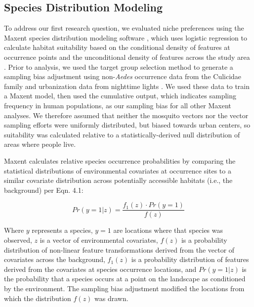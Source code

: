 \subsection{Species Distribution Modeling}

To address our first research question, we evaluated niche preferences using the Maxent species distribution modeling software \cite{Phillips2006-ua, Steven_J_Phillips_Miroslav_Dudik_Robert_E_Schapire_undated-nv}, which uses logistic regression to calculate habitat suitability based on the conditional density of features at occurrence points and the unconditional density of features across the study area \cite{Elith2011-kb}. Prior to analysis, we used the target group selection method \cite{Phillips2009-nf, Merow2013-mw} to generate a sampling bias adjustment using non-\textit{Aedes} occurrence data from the Culicidae family and urbanization data from nighttime lights \cite{Mills2013-yb}. We used these data to train a Maxent model, then used the cumulative output, which indicates sampling frequency in human populations, as our sampling bias for all other Maxent analyses. We therefore assumed that neither the mosquito vectors nor the vector sampling efforts were uniformly distributed, but biased towards urban centers, so suitability was calculated relative to a statistically-derived null distribution of areas where people live.

Maxent calculates relative species occurrence probabilities by comparing the statistical distributions of environmental covariates at occurrence sites to a similar covariate distribution across potentially accessible habitats (i.e., the background) per Eqn. 4.1:

\begin{equation}
Pr(y=1|z) = 
\frac{f_1(z) \cdot Pr(y=1)}{f(z)}
\end{equation}

Where $y$ represents a species, $y=1$ are locations where that species was observed, $z$ is a vector of environmental covariates, $f(z)$ is a probability distribution of non-linear feature transformations derived from the vector of covariates across the background, $f_1(z)$ is a probability distribution of features derived from the covariates at species occurrence locations, and $Pr(y=1|z)$ is the probability that a species occurs at a point on the landscape as conditioned by the environment. The sampling bias adjustment modified the locations from which the distribution $f(z)$ was drawn.

